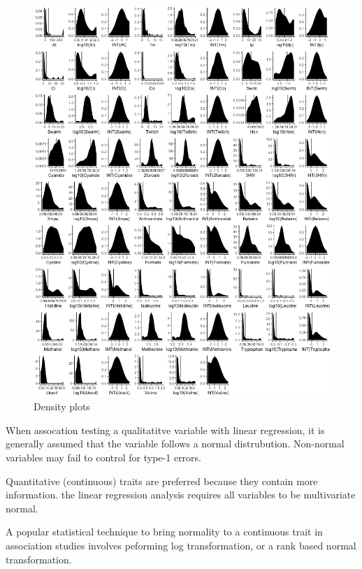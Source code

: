 \documentclass[]{article}
\begin{document}
\begin{figure}

{\centering \includegraphics[height=0.9\textheight]{_static/dens} 

}

\caption{\label{fig:dens}Density plots}\label{fig:unnamed-chunk-7}
\end{figure}

When assocation testing a qualitatitve variable with linear regression,
it is generally assumed that the variable follows a normal distrubution.
Non-normal variables may fail to control for type-1 errors.

Quantitative (continuous) traits are preferred because they contain more
information. the linear regression analysis requires all variables to be
multivariate normal.

A popular statistical technique to bring normality to a continuous trait
in association studies involves peforming log transformation, or a rank
based normal transformation.
\end{document}
